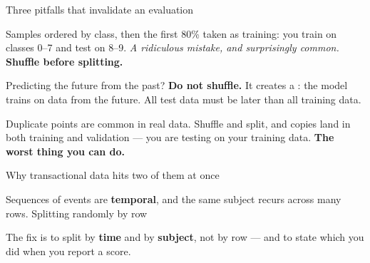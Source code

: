 \documentclass[aspectratio=169,11pt,t]{beamer}
\begin{document}
\begin{frame}[shrink=25]{Three pitfalls that invalidate an evaluation}
\begin{minipage}[t]{0.3253\textwidth}
\begin{icardwarn}
Samples ordered by class, then the first 80\% taken as training: you train on classes 0--7 and test on 8--9. \textit{A ridiculous mistake, and surprisingly common.} \textbf{Shuffle before splitting.}
\end{icardwarn}
\end{minipage}%
\hfill
\begin{minipage}[t]{0.3253\textwidth}
\begin{icardbad}
Predicting the future from the past? \textbf{Do not shuffle.} It creates a : the model trains on data from the future. All test data must be later than all training data.
\end{icardbad}
\end{minipage}%
\hfill
\begin{minipage}[t]{0.3253\textwidth}
\begin{icardbad}
Duplicate points are common in real data. Shuffle and split, and copies land in both training and validation --- you are testing on your training data. \textbf{The worst thing you can do.}
\end{icardbad}
\end{minipage}%
\end{frame}

\begin{frame}[shrink=25]{Why transactional data hits two of them at once}
\begin{iband}[amber]
Sequences of events are \textbf{temporal}, and the same subject recurs across many rows. Splitting randomly by row 
\end{iband}
{\fontsize{9.4}{12.6}\selectfont\color{fg2}The fix is to split by \textbf{time} and by \textbf{subject}, not by row --- and to state which you did when you report a score.\par}\vskip 4pt
\end{frame}

\end{document}

